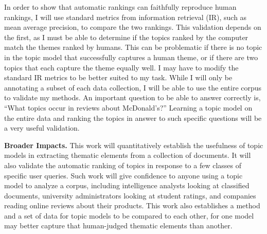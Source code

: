 \documentclass[onecolumn, 12pt]{article}
\begin{document}
In order to show that automatic rankings can faithfully reproduce human
rankings, I will use standard metrics from information retrieval (IR), such as
mean average precision, to compare the two rankings.  This validation depends
on the first, as I must be able to determine if the topics ranked by the
computer match the themes ranked by humans.  This can be problematic if there
is no topic in the topic model that successfully captures a human theme, or if
there are two topics that each capture the theme equally well.  I may have to
modify the standard IR metrics to be better suited to my task.  While I will
only be annotating a subset of each data collection, I will be able to use the
entire corpus to validate my methods.  An important question to be able to
answer correctly is, ``What topics occur in reviews about McDonald's?''
Learning a topic model on the entire data and ranking the topics in answer to
such specific questions will be a very useful validation.

\textbf{Broader Impacts.}  This work will quantitatively establish the
usefulness of topic models in extracting thematic elements from a collection of
documents.  It will also validate the automatic ranking of topics in response
to a few classes of specific user queries.  Such work will give confidence to
anyone using a topic model to analyze a corpus, including intelligence analysts
looking at classified documents, university administrators looking at student
ratings, and companies reading online reviews about their products.  This work
also establishes a method and a set of data for topic models to be compared to
each other, for one model may better capture that human-judged thematic
elements than another.

\footnotesize

\renewcommand\bibsection{\subsubsection*{References}}

\end{document}
